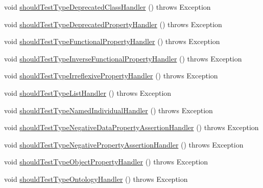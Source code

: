 \begin{DoxyCompactItemize}
\item 
void \hyperlink{classorg_1_1semanticweb_1_1owlapi_1_1contract_1_1_contract_rdfxml_parser_test_a9db3ecc4b5eee26e7494cb61f747679d}{should\-Test\-Type\-Deprecated\-Class\-Handler} ()  throws Exception 
\item 
void \hyperlink{classorg_1_1semanticweb_1_1owlapi_1_1contract_1_1_contract_rdfxml_parser_test_a8c72891672f4eeb49fd39a88bca82024}{should\-Test\-Type\-Deprecated\-Property\-Handler} ()  throws Exception 
\item 
void \hyperlink{classorg_1_1semanticweb_1_1owlapi_1_1contract_1_1_contract_rdfxml_parser_test_ac2655f9a77921a7211a3d92942f39d30}{should\-Test\-Type\-Functional\-Property\-Handler} ()  throws Exception 
\item 
void \hyperlink{classorg_1_1semanticweb_1_1owlapi_1_1contract_1_1_contract_rdfxml_parser_test_a8b048c8292d3febb82e3e2191ff847e4}{should\-Test\-Type\-Inverse\-Functional\-Property\-Handler} ()  throws Exception 
\item 
void \hyperlink{classorg_1_1semanticweb_1_1owlapi_1_1contract_1_1_contract_rdfxml_parser_test_a0794cc2765c70efee827d12f1f39c990}{should\-Test\-Type\-Irreflexive\-Property\-Handler} ()  throws Exception 
\item 
void \hyperlink{classorg_1_1semanticweb_1_1owlapi_1_1contract_1_1_contract_rdfxml_parser_test_a9ea42aca69e702f171cec7547e5eef5b}{should\-Test\-Type\-List\-Handler} ()  throws Exception 
\item 
void \hyperlink{classorg_1_1semanticweb_1_1owlapi_1_1contract_1_1_contract_rdfxml_parser_test_a25df6b32c26599db869a0cec184a45fc}{should\-Test\-Type\-Named\-Individual\-Handler} ()  throws Exception 
\item 
void \hyperlink{classorg_1_1semanticweb_1_1owlapi_1_1contract_1_1_contract_rdfxml_parser_test_a022e5bca4c80e8ab90d7a2ce9999d518}{should\-Test\-Type\-Negative\-Data\-Property\-Assertion\-Handler} ()  throws Exception 
\item 
void \hyperlink{classorg_1_1semanticweb_1_1owlapi_1_1contract_1_1_contract_rdfxml_parser_test_a4ca3128d135af4d18d6bea46e6066c97}{should\-Test\-Type\-Negative\-Property\-Assertion\-Handler} ()  throws Exception 
\item 
void \hyperlink{classorg_1_1semanticweb_1_1owlapi_1_1contract_1_1_contract_rdfxml_parser_test_a9f73cccdd0ac1ecef8a05bd24fd43b52}{should\-Test\-Type\-Object\-Property\-Handler} ()  throws Exception 
\item 
void \hyperlink{classorg_1_1semanticweb_1_1owlapi_1_1contract_1_1_contract_rdfxml_parser_test_aeb59d186e996fea14b7adc03804f8785}{should\-Test\-Type\-Ontology\-Handler} ()  throws Exception 

\end{DoxyCompactItemize}
